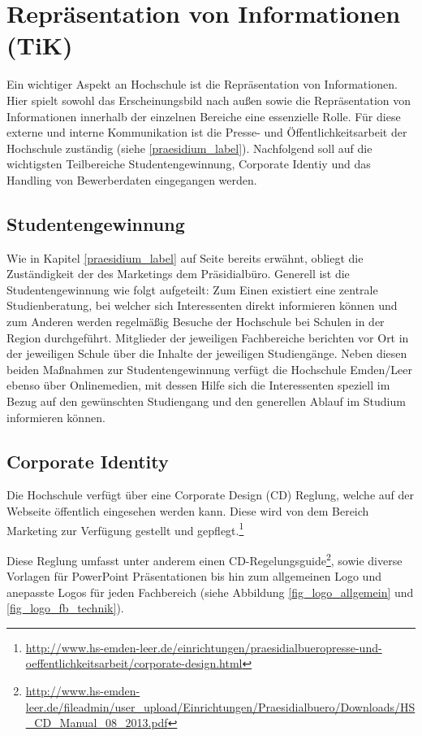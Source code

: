 \section{Repräsentation von Informationen (TiK)}
Ein wichtiger Aspekt an Hochschule ist die Repräsentation von Informationen. Hier spielt sowohl das Erscheinungsbild nach außen sowie die Repräsentation von Informationen innerhalb der einzelnen Bereiche eine essenzielle Rolle. Für diese externe und interne Kommunikation ist die Presse- und Öffentlichkeitsarbeit der Hochschule zuständig (siehe \ref{praesidium_label}). Nachfolgend soll auf die wichtigsten Teilbereiche Studentengewinnung, Corporate Identiy und das Handling von Bewerberdaten eingegangen werden.

\subsection{Studentengewinnung}
Wie in Kapitel \ref{praesidium_label} auf Seite \pageref{praesidium_label} bereits erwähnt, obliegt die Zuständigkeit der des Marketings dem Präsidialbüro. Generell ist die Studentengewinnung wie folgt aufgeteilt: Zum Einen existiert eine zentrale Studienberatung, bei welcher sich Interessenten direkt informieren können und zum Anderen werden regelmäßig Besuche der Hochschule bei Schulen in der Region durchgeführt. Mitglieder der jeweiligen Fachbereiche berichten vor Ort in der jeweiligen Schule über die Inhalte der jeweiligen Studiengänge. Neben diesen beiden Maßnahmen zur Studentengewinnung verfügt die Hochschule Emden/Leer ebenso über Onlinemedien, mit dessen Hilfe sich die Interessenten speziell im Bezug auf den gewünschten Studiengang und den generellen Ablauf im Studium informieren können.

\subsection{Corporate Identity}
Die Hochschule verfügt über eine Corporate Design (CD) Reglung, welche auf der Webseite öffentlich eingesehen werden kann. Diese wird von dem Bereich Marketing zur Verfügung gestellt und gepflegt.\footnote{\url{http://www.hs-emden-leer.de/einrichtungen/praesidialbueropresse-und-oeffentlichkeitsarbeit/corporate-design.html}}

Diese Reglung umfasst unter anderem einen CD-Regelungsguide\footnote{\url{http://www.hs-emden-leer.de/fileadmin/user_upload/Einrichtungen/Praesidialbuero/Downloads/HS_CD_Manual_08_2013.pdf}}, sowie diverse Vorlagen für PowerPoint Präsentationen bis hin zum allgemeinen Logo und anepasste Logos für jeden Fachbereich (siehe Abbildung \ref{fig_logo_allgemein} und \ref{fig_logo_fb_technik}).

